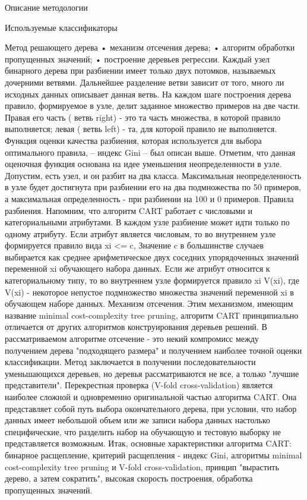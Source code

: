 \begin{section}{Описание методологии}
\begin{subsection}{Используемые классификаторы}
\begin{subsubsection}{Метод решающего дерева}
•	механизм отсечения дерева;
•	алгоритм обработки пропущенных значений;
•	построение деревьев регрессии.
Каждый узел бинарного дерева при разбиении имеет только двух потомков, называемых дочерними ветвями. Дальнейшее разделение ветви зависит от того, много ли исходных данных описывает данная ветвь. На каждом шаге построения дерева правило, формируемое в узле, делит заданное множество примеров на две части. Правая его часть ( ветвь right) - это та часть множества, в которой правило выполняется; левая ( ветвь left) - та, для которой правило не выполняется.
Функция оценки качества разбиения, которая используется для выбора оптимального правила, – индекс Gini – был описан выше. Отметим, что данная оценочная функция основана на идее уменьшения неопределенности в узле. Допустим, есть узел, и он разбит на два класса. Максимальная неопределенность в узле будет достигнута при разбиении его на два подмножества по 50 примеров, а максимальная определенность - при разбиении на 100 и 0 примеров.
Правила разбиения. Напомним, что алгоритм CART работает с числовыми и категориальными атрибутами. В каждом узле разбиение может идти только по одному атрибуту. Если атрибут является числовым, то во внутреннем узле формируется правило вида xi <= c, Значение c в большинстве случаев выбирается как среднее арифметическое двух соседних упорядоченных значений переменной xi обучающего набора данных. Если же атрибут относится к категориальному типу, то во внутреннем узле формируется правило xi V(xi), где V(xi) - некоторое непустое подмножество множества значений переменной xi в обучающем наборе данных.
Механизм отсечения. Этим механизмом, имеющим название minimal cost-complexity tree pruning, алгоритм CART принципиально отличается от других алгоритмов конструирования деревьев решений. В рассматриваемом алгоритме отсечение - это некий компромисс между получением дерева "подходящего размера" и получением наиболее точной оценки классификации. Метод заключается в получении последовательности уменьшающихся деревьев, но деревья рассматриваются не все, а только "лучшие представители".
Перекрестная проверка (V-fold cross-validation) является наиболее сложной и одновременно оригинальной частью алгоритма CART. Она представляет собой путь выбора окончательного дерева, при условии, что набор данных имеет небольшой объем или же записи набора данных настолько специфические, что разделить набор на обучающую и тестовую выборку не представляется возможным.
Итак, основные характеристики алгоритма CART: бинарное расщепление, критерий расщепления - индекс Gini, алгоритмы minimal cost-complexity tree pruning и V-fold cross-validation, принцип "вырастить дерево, а затем сократить", высокая скорость построения, обработка пропущенных значений.

\end{subsubsection}
\end{subsection}
\end{section}
